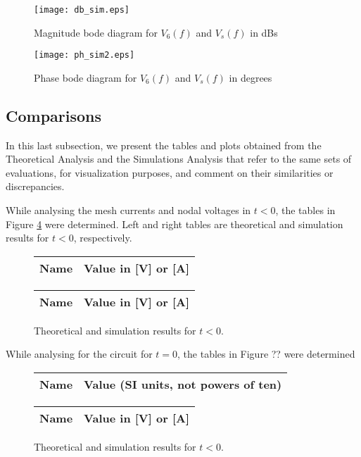 \begin{figure}[!ht]
  \centering
  \texttt{[image: db\_sim.eps]}
  \caption{Magnitude bode diagram for $V_6(f)$ and $V_s(f)$ in dBs}
  \label{bode1_sim}
\end{figure}

\begin{figure}[!ht]
  \centering
  \texttt{[image: ph\_sim2.eps]}
  \caption{Phase bode diagram for $V_6(f)$ and $V_s(f)$ in degrees}
  \label{bode2_sim}
\end{figure}

\subsection{Comparisons}

In this last subsection, we present the tables and plots obtained from the Theoretical Analysis and the Simulations Analysis that refer to the same sets of evaluations, for visualization purposes, and comment on their similarities or discrepancies.

While analysing the mesh currents and nodal voltages in $t<0$, the tables in Figure \ref{fig:t<0_comp} were determined. Left and right tables are theoretical and simulation results for $t<0$, respectively.



\begin{figure}[ht!]
    \centering
    \begin{tabular}{|l|r|}
        \hline    
        {\bf Name} & {\bf Value in [V] or [A]} \\ \hline
        
    \end{tabular}
\quad
    \begin{tabular}{|l|r|}
        \hline    
        {\bf Name} & {\bf Value in [V] or [A]} \\ \hline
        
    \end{tabular}
    \caption{Theoretical and simulation results for $t<0$.}
    \label{fig:t<0_comp}
\end{figure}

While analysing for the circuit for $t=0$, the tables in Figure ?? were determined

\begin{figure}[ht!]
    \centering
    \begin{tabular}{|l|r|}
        \hline    
        {\bf Name} & {\bf Value (SI units, not powers of ten)} \\ \hline
        
    \end{tabular}
\quad
    \begin{tabular}{|l|r|}
        \hline    
        {\bf Name} & {\bf Value in [V] or [A]} \\ \hline
        
    \end{tabular}
    \caption{Theoretical and simulation results for $t<0$.}
    \label{fig:t<0_comp}
\end{figure}

